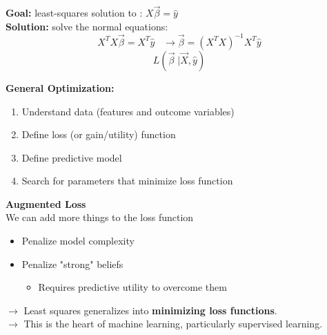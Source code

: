 \documentclass[letterpaper, 10.5pt,landscape]{article}
\begin{document}
\begin{multicols*}{3}
\textbf{Goal: }least-squares solution to : \(\boxed{X \Vec{\beta} = \hat{y} }\) \\
\textbf{Solution: } solve the normal equations:
\vspace{-2pt}
\[
    X^{T} X \Vec{\beta} = X^{T} \hat{y} 
    \hspace{10pt}  \rightarrow \vec{\beta}  = (X^{T}X)^{-1} X^{T} \hat{y} 
\]
\vspace{-7pt}
\[ \boxed{L(\Vec{\beta} \;| \Vec{X}, \hat{y} )} \]







\textbf{General Optimization: }\\
\vspace{-3pt}
\begin{enumerate}
    \item Understand data (features and outcome variables) 
    \vspace{-3pt}
    \item Define loss (or gain/utility) function
    \vspace{-3pt}
    \item Define predictive model
    \vspace{-3pt}
    \item Search for parameters that minimize loss function
    \vspace{-3pt}
\end{enumerate}



\textbf{Augmented Loss} \\
We can add more things to the loss function
\vspace{-3pt}
\begin{itemize}
    \item Penalize model complexity
    \vspace{-3pt}
    \item Penalize "strong" beliefs
    \vspace{-3pt}
    \begin{itemize}
        \vspace{-3pt}
        \item Requires predictive utility to overcome them
    \end{itemize}
\end{itemize}




$\rightarrow$ Least squares generalizes into \textbf{minimizing loss functions}. \\
$\rightarrow$ This is the heart of machine learning, particularly supervised learning.






\end{multicols*}
\end{document}
